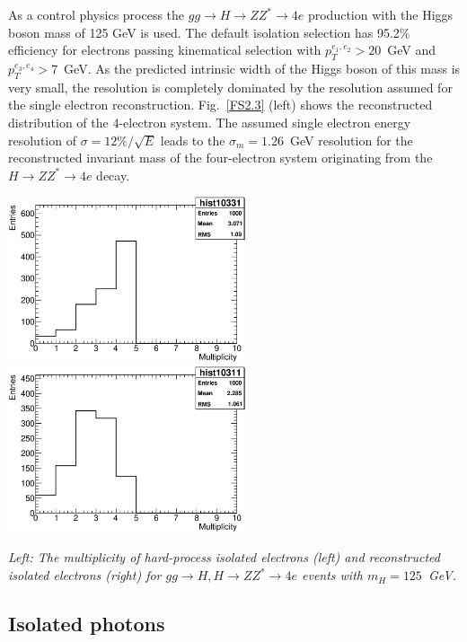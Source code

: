 As a control physics process  the
 $gg \to H \to ZZ^* \to 4e $ production with the 
Higgs boson mass of 125 GeV is used. The default
isolation selection has 95.2\% efficiency for electrons passing
kinematical selection  with 
$p_T^{e_1, e_2} > 20$~GeV and $p_T^{e_3, e_4} > 7$~GeV.
As the predicted intrinsic width
of the Higgs boson of this mass is very small, the resolution is
completely dominated by the resolution assumed for the 
single electron reconstruction. Fig.~\ref{FS2.3} (left) shows the
reconstructed distribution of the 4-electron system.
The assumed single electron energy resolution of $\sigma = 12\%/\sqrt{E}$
leads to the $\sigma_m = 1.26$~GeV resolution for the reconstructed invariant mass
of the four-electron system originating from the $ H \to ZZ^* \to 4e $
decay. 



\begin{Fighere}
\begin{center}
   \includegraphics[width=7.0cm,angle=0]{plot-HPisolElectrons.eps}
   \includegraphics[width=7.0cm,angle=0]{plot-recoElectrons.eps}
\end{center}
\caption{\em
Left: The multiplicity of  hard-process isolated electrons (left) and reconstructed isolated electrons (right) 
for $gg \to H, H \to ZZ^* \to 4 e$ events with $m_H=125$~GeV.
\label{FS2.3}} 
\end{Fighere}


\boldmath 
\subsection{Isolated photons}
\unboldmath

